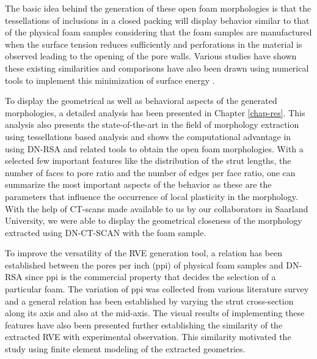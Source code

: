 The basic idea behind the generation of these open foam morphologies is that the tessellations of inclusions in a closed packing will display behavior similar to that of the physical foam samples considering that the foam samples are manufactured when the surface tension reduces sufficiently and perforations in the material is observed leading to the opening of the pore walls. Various studies have shown these existing similarities and comparisons have also been drawn using numerical tools to implement this minimization of surface energy \cite{kraynikStructureRandomFoam2004}. 

To display the geometrical as well as behavioral aspects of the generated morphologies, a detailed analysis has been presented in Chapter \ref{chap-res}. This analysis also presents the state-of-the-art in the field of morphology extraction using tessellations based analysis and shows the computational advantage in using DN-RSA and related tools to obtain the open foam morphologies. With a selected few important features like the distribution of the strut lengths, the number of faces to pore ratio and the number of edges per face ratio, one can summarize the most important aspects of the behavior as these are the parameters that influence the occurrence of local plasticity in the morphology. With the help of CT-scans made available to us by our collaborators in Saarland University, we were able to display the geometrical closeness of the morphology extracted using DN-CT-SCAN with the foam sample. 

To improve the versatility of the RVE generation tool, a relation has been established between the pores per inch (ppi) of physical foam samples and DN-RSA since ppi is the commercial property that decides the selection of a particular foam. The variation of ppi was collected from various literature survey and a general relation has been established by varying the strut cross-section along its axis and also at the mid-axis. The visual results of implementing these features have also been presented further establishing the similarity of the extracted RVE with experimental observation. This similarity motivated the study using finite element modeling of the extracted geometries.

